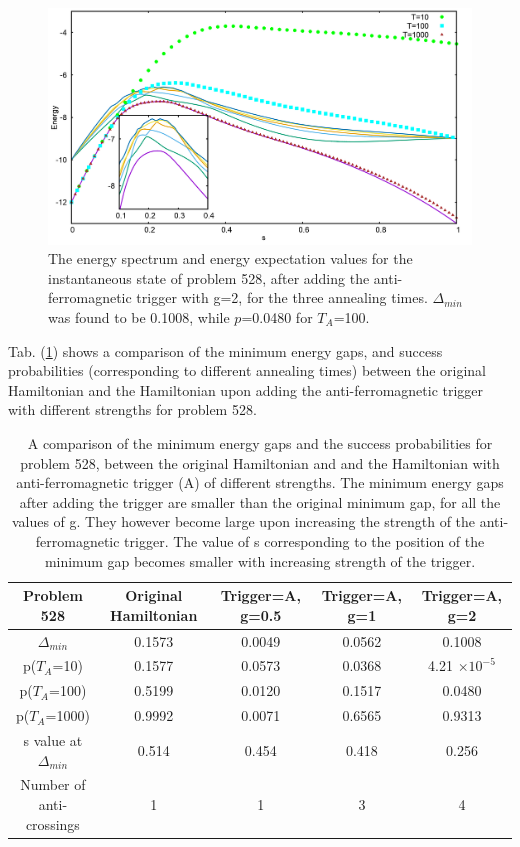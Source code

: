 \documentclass[../main.tex]{subfiles}
\begin{document}
\begin{figure}[H]
\centering 
\includegraphics[scale=0.24]{528_s12_A_g2.png}
\caption{The energy spectrum and energy expectation values for the instantaneous state of problem 528, after adding the anti-ferromagnetic trigger with g=2, for the three annealing times. $\Delta_{min}$ was found to be 0.1008, while $p$=0.0480 for $T_A$=100. }
\label{fig:a9}
\end{figure}

Tab. (\ref{tab:a3}) shows a comparison of the minimum energy gaps, and success probabilities (corresponding to different annealing times) between the original Hamiltonian and the Hamiltonian upon adding the anti-ferromagnetic trigger with different strengths for problem 528. 

\begin{table}[H]
\centering
\renewcommand{\arraystretch}{1.5}
\begin{tabular}{|c|c|c|c|c|}
\hline 
Problem 528 & Original Hamiltonian & Trigger=A, g=0.5 & Trigger=A, g=1 & Trigger=A, g=2 \\ 
\hline 
$\Delta_{min}$ & 0.1573 & 0.0049 & 0.0562 & 0.1008 \\ 
\hline 
p($T_A$=10) & 0.1577 & 0.0573 & 0.0368 & 4.21 $\times 10^{-5}$\\ 
\hline 
p($T_A$=100) & 0.5199 & 0.0120 & 0.1517 & 0.0480 \\ 
\hline 
p($T_A$=1000) & 0.9992 & 0.0071 & 0.6565 & 0.9313 \\ 
\hline 
s value at $\Delta_{min}$ & 0.514 & 0.454 & 0.418 & 0.256 \\ 
\hline 
Number of anti-crossings & 1 & 1 & 3 & 4 \\
\hline
\end{tabular} 
\caption{A comparison of the minimum energy gaps and the success probabilities for problem 528, between the original Hamiltonian and and the Hamiltonian with anti-ferromagnetic trigger (A) of different strengths. The minimum energy gaps after adding the trigger are smaller than the original minimum gap, for all the values of g. They however become large upon increasing the strength of the anti-ferromagnetic trigger. The value of s corresponding to the position of the minimum gap becomes smaller with increasing strength of the trigger.}
\label{tab:a3}
\end{table}
\end{document}
